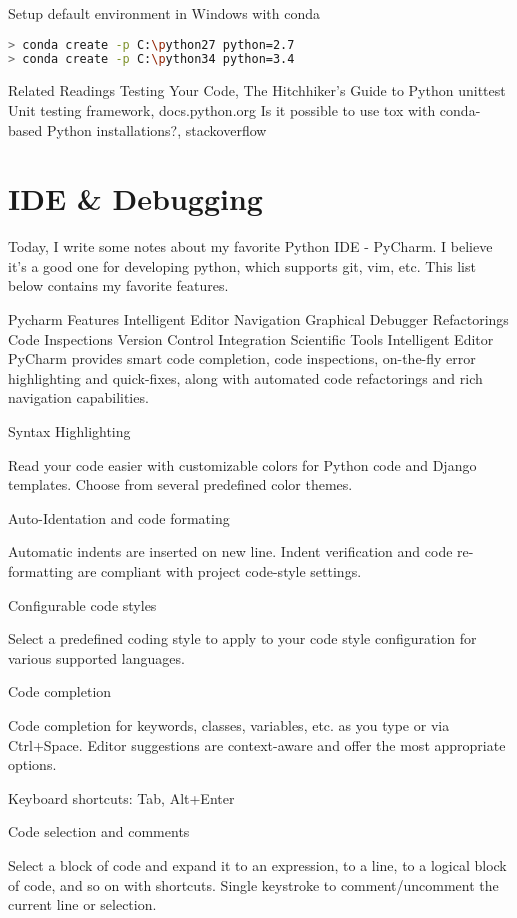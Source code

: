 Setup default environment in Windows with conda

\begin{lstlisting}[language=bash]
> conda create -p C:\python27 python=2.7
> conda create -p C:\python34 python=3.4
\end{lstlisting}

Related Readings
Testing Your Code, The Hitchhiker's Guide to Python
unittest  Unit testing framework, docs.python.org
Is it possible to use tox with conda-based Python installations?, stackoverflow

\section{IDE \& Debugging}

Today, I write some notes about my favorite Python IDE - PyCharm. I believe it's a good one for developing python, which supports git, vim, etc. This list below contains my favorite features.

Pycharm Features
Intelligent Editor
Navigation
Graphical Debugger
Refactorings
Code Inspections
Version Control Integration
Scientific Tools
Intelligent Editor
PyCharm provides smart code completion, code inspections, on-the-fly error highlighting and quick-fixes, along with automated code refactorings and rich navigation capabilities.

Syntax Highlighting

Read your code easier with customizable colors for Python code and Django templates. Choose from several predefined color themes.

Auto-Identation and code formating

Automatic indents are inserted on new line. Indent verification and code re-formatting are compliant with project code-style settings.

Configurable code styles

Select a predefined coding style to apply to your code style configuration for various supported languages.

Code completion

Code completion for keywords, classes, variables, etc. as you type or via Ctrl+Space. Editor suggestions are context-aware and offer the most appropriate options.

Keyboard shortcuts: Tab, Alt+Enter

Code selection and comments

Select a block of code and expand it to an expression, to a line, to a logical block of code, and so on with shortcuts. Single keystroke to comment/uncomment the current line or selection.

